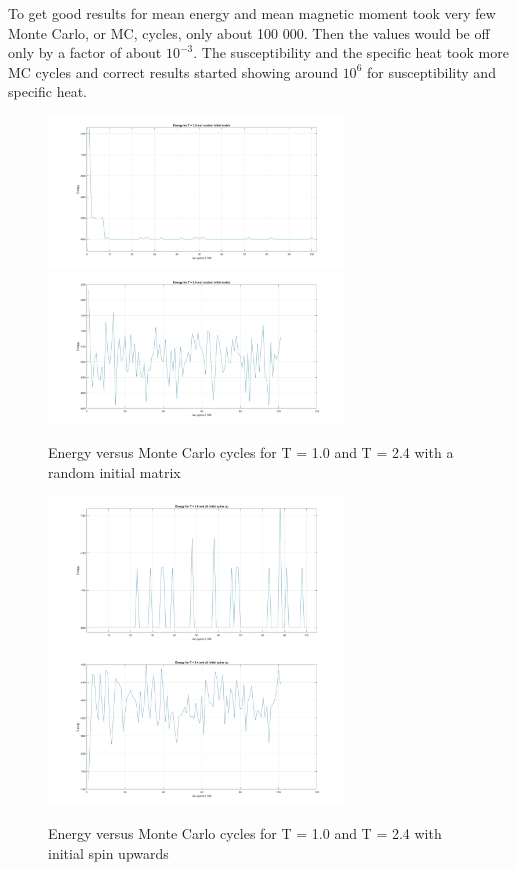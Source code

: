 \documentclass[10pt,a4paper]{article}
\begin{document}
\noindent To get good results for mean energy and mean magnetic moment took very few Monte Carlo, or MC, cycles, only about 100 000. Then the values would be off only by a factor of about $10^{-3}$. The susceptibility and the specific heat took more MC cycles and correct results started showing around $10^{6}$ for susceptibility and specific heat.

\begin{figure}[H]
\centering
\includegraphics[width=0.7\textwidth]{energyT1random}
\includegraphics[width=0.7\textwidth]{energyT24random}
\caption{Energy versus Monte Carlo cycles for T = 1.0 and T = 2.4 with a random initial matrix}
\label{fig:energyrandom}
\end{figure}

\begin{figure}[H]
\centering
\includegraphics[width=0.7\textwidth]{energyT1upspin}
\includegraphics[width=0.7\textwidth]{energyT24upspin}
\caption{Energy versus Monte Carlo cycles for T = 1.0 and T = 2.4 with initial spin upwards}
\label{fig:energyupspin}
\end{figure}
\end{document}
